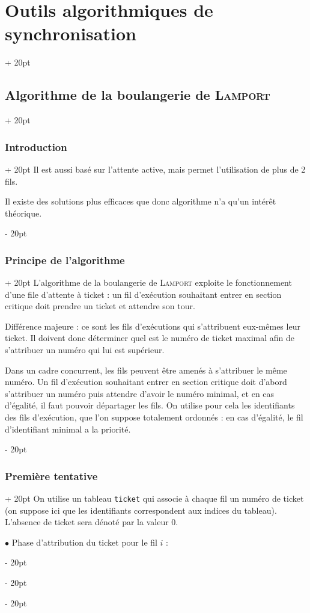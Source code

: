 \documentclass[a4paper, 12pt, twoside]{article}
\newcommand{\ind}[1][20pt]{\advance\leftskip + #1}
\newcommand{\deind}[1][20pt]{\advance\leftskip - #1}
\newenvironment{indt}[2][20pt]{#2 \par \ind[#1]}{\par \deind} %
\begin{document}
\begin{indt}{\section{Outils algorithmiques de synchronisation}}
\begin{indt}{\subsection{Algorithme de la boulangerie de \textsc{Lamport}}}
\begin{indt}{\subsubsection{Introduction}}
                Il est aussi basé sur l'attente active, mais permet l'utilisation de plus de 2 fils.

                Il existe des solutions plus efficaces que donc algorithme n'a qu'un intérêt théorique.
            \end{indt}

            \vspace{12pt}
            
            \begin{indt}{\subsubsection{Principe de l'algorithme}}
                L'algorithme de la boulangerie de \textsc{Lamport} exploite le fonctionnement d'une file d'attente à ticket : un fil d'exécution souhaitant entrer en section critique doit prendre un ticket et attendre son tour.

                Différence majeure : ce sont les fils d'exécutions qui s'attribuent eux-mêmes leur ticket. Il doivent donc déterminer quel est le numéro de ticket maximal afin de s'attribuer un numéro qui lui est supérieur.

                Dans un cadre concurrent, les fils peuvent être amenés à s'attribuer le même numéro.
                Un fil d'exécution souhaitant entrer en section critique doit d'abord s'attribuer un numéro puis attendre d'avoir le numéro minimal, et en cas d'égalité, il faut pouvoir départager les fils.
                On utilise pour cela les identifiants des fils d'exécution, que l'on suppose totalement ordonnés : en cas d'égalité, le fil d'identifiant minimal a la priorité.
            \end{indt}

            \vspace{12pt}
            
            \begin{indt}{\subsubsection{Première tentative}}
                On utilise un tableau \texttt{ticket} qui associe à chaque fil un numéro de ticket (on suppose ici que les identifiants correspondent aux indices du tableau).
                L'absence de ticket sera dénoté par la valeur 0.

                $\bullet$ Phase d'attribution du ticket pour le fil $i$ :


\end{indt}
\end{indt}
\end{indt}
\end{document}
